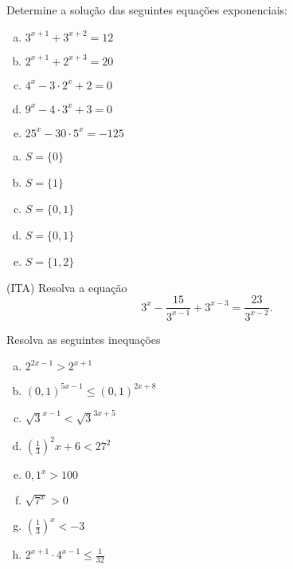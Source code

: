 \begin{secExercicios}
 \begin{exer}
 Determine a solução das seguintes equações exponenciais:
 \begin{enumerate}[a)]
 \item $3^{x+1} + 3^{x+2}= 12$
 \item $2^{x+1} + 2^{x+3}= 20$
  \item $4^x - 3 \cdot 2^x + 2=0$
 \item $9^x - 4 \cdot 3^x + 3= 0$
 \item $25^x - 30 \cdot 5^x = -125$
 \end{enumerate}
 \end{exer}
 \begin{resp}
 \begin{multicols}{2}
  \begin{enumerate}[a)]
 \item $S= \{ 0 \}$
 \item $S= \{ 1 \}$
  \item $S= \{ 0, 1 \}$
 \item $S= \{ 0, 1 \}$
 \item $S= \{ 1, 2 \}$
 \end{enumerate}
 \end{multicols}
 \end{resp}

\begin{exer}
    (ITA) Resolva a equação
    \begin{equation*}
        3^x-\dfrac{15}{3^{x-1}}+3^{x-3}=\dfrac{23}{3^{x-2}}.
    \end{equation*}
\end{exer}

 \begin{exer}
     Resolva as seguintes inequações
     \begin{enumerate}[a)]
         \item $2^{2x-1}>2^{x+1}$
         \item $(0,1)^{5x-1}\leq (0,1)^{2x+8}$
         \item $\sqrt{3}^{x-1}<\sqrt{3}^{3x+5}$
         \item $(\frac{1}{3})^2x+6<27^2$
         \item $0,1^x>100$
         \item $\sqrt{7^x}>0$
         \item $(\frac{1}{3})^x<-3$
         \item $2^{x+1}\cdot 4^{x-1}\leq \frac{1}{32}$
     \end{enumerate}
 \end{exer}


\end{secExercicios}
